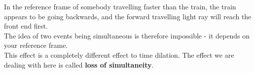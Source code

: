 \documentclass[revision-guide.tex]{subfiles}
\begin{document}
\begin{figure}[h]
	\begin{center}
		
		
	\end{center}
\end{figure}
In the reference frame of somebody travelling faster than the train, the train appears to be going backwards, and the forward travelling light ray will reach the front end first. 
\\
The idea of two events being simultaneous is therefore impossible - it depends on your reference frame.
\\

This effect is  a completely different effect to time dilation.  The effect we are dealing with here is called \textbf{loss of simultaneity}.
\end{document}
